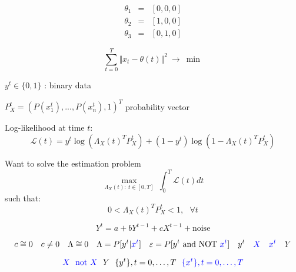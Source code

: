 \documentclass{article}
\begin{document}
\begin{displaymath}
 \begin{array}{rcl}
  \theta_1 & = & [0,0,0] \\
  \theta_2 & = & [1,0,0] \\
  \theta_3 & = & [0,1,0] 
 \end{array}
\end{displaymath}


\begin{displaymath}
 \sum\limits_{t=0}^T \Vert x_t - \theta(t) \Vert^2 ~ \rightarrow ~ \min
\end{displaymath}



$y^t \in \{ 0 , 1\} $ : binary data 

\vspace{0.5cm} 

$P_X^t = \left(  P(x_1^t),...,P(x_n^t),1 \right)^T$ probability vector

\vspace{0.5cm} 

Log-likelihood at time $t$:
\begin{equation*}
\mathcal{L} (t) = y^t \log \left( \Lambda_X(t)^{T} P_X^t \right) + (1-y^t )\log \left( 1- \Lambda_X(t)^{T} P_X^t \right) 
\end{equation*}

\vspace{0.5cm}  


Want to solve the estimation problem
\begin{equation*}
\underset{ \Lambda_X(t): \ t \in [0,T]}{\max} \ \int_0^T \mathcal{L}(t) dt
\end{equation*}
such that:
\begin{equation*}
0 < \Lambda_X(t)^{T} P_X^t  < 1, \ \ \ \forall t
\end{equation*}

\begin{displaymath}
 Y^t = a + b Y^{t-1} + c X^{t-1} + \textrm{noise}
\end{displaymath}

\begin{displaymath}
 c \cong 0 ~~~ c \neq 0 ~~~ \Lambda \cong 0 ~~~ \Lambda = P[y^t \vert {\color{blue} x^t}] ~~~ \varepsilon = P[y^t ~\textrm{and NOT} ~ {\color{blue} x^t}]
 ~~~ y^t ~~~ {\color{blue} X} ~~~ {\color{blue} x^t} ~~~ Y
\end{displaymath}

\begin{displaymath}
 {\color{blue} X} ~~
 {\color{blue} \textrm{not}~X} ~~ Y ~~
 \lbrace y^t \rbrace, t = 0,\dots,T ~~
 {\color{blue}  \lbrace x^t \rbrace, t = 0,\dots,T} 
\end{displaymath}
\end{document}

